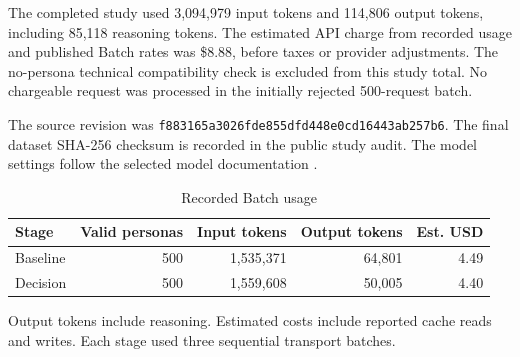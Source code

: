 The completed study used 3,094,979 input tokens and 114,806 output tokens, including 85,118 reasoning tokens. The estimated API charge from recorded usage and published Batch rates was \$8.88, before taxes or provider adjustments. The no-persona technical compatibility check is excluded from this study total. No chargeable request was processed in the initially rejected 500-request batch.

The source revision was {\footnotesize\texttt{f883165a3026fde855dfd448e0cd16443ab257b6}}. The final dataset SHA-256 checksum is recorded in the public study audit. The model settings follow the selected model documentation \citep{openaiModel}.

\begin{table}[htbp]
\centering
\small
\caption{Recorded Batch usage}
\begin{tabular}{lrrrr}
\toprule
Stage & Valid personas & Input tokens & Output tokens & Est. USD\\
\midrule
Baseline & 500 & 1,535,371 & 64,801 & 4.49\\
Decision & 500 & 1,559,608 & 50,005 & 4.40\\
\bottomrule
\end{tabular}
\par\smallskip
\begin{minipage}{.96\linewidth}\footnotesize Output tokens include reasoning. Estimated costs include reported cache reads and writes. Each stage used three sequential transport batches.\end{minipage}
\end{table}
